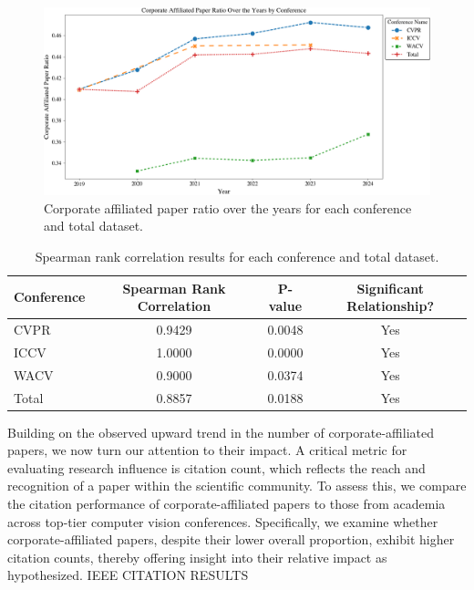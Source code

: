 \documentclass{article}
\begin{document}
\begin{figure}[ht]
  \centering
  \includegraphics[width=\textwidth]{report/images/corporate_ratio_graph_final.png}  
  \caption{Corporate affiliated paper ratio over the years for each conference and total dataset.}
  \label{fig:corporate_ratio_graph}
\end{figure}

\begin{table}[ht]
\centering
\begin{tabular}{|l|c|c|c|}
\hline
\textbf{Conference} & \textbf{Spearman Rank Correlation} & \textbf{P-value} & \textbf{Significant Relationship?} \\ \hline
CVPR & 0.9429 & 0.0048 & Yes \\ \hline
ICCV & 1.0000 & 0.0000 & Yes \\ \hline
WACV & 0.9000 & 0.0374 & Yes \\ \hline
Total & 0.8857 & 0.0188 & Yes \\ \hline
\end{tabular}
\caption{Spearman rank correlation results for each conference and total dataset.}
\label{tab:spearman_results}
\end{table}

Building on the observed upward trend in the number of corporate-affiliated papers, we now turn our attention to their impact. A critical metric for evaluating research influence is citation count, which reflects the reach and recognition of a paper within the scientific community. To assess this, we compare the citation performance of corporate-affiliated papers to those from academia across top-tier computer vision conferences. Specifically, we examine whether corporate-affiliated papers, despite their lower overall proportion, exhibit higher citation counts, thereby offering insight into their relative impact as hypothesized. IEEE CITATION RESULTS
\end{document}
